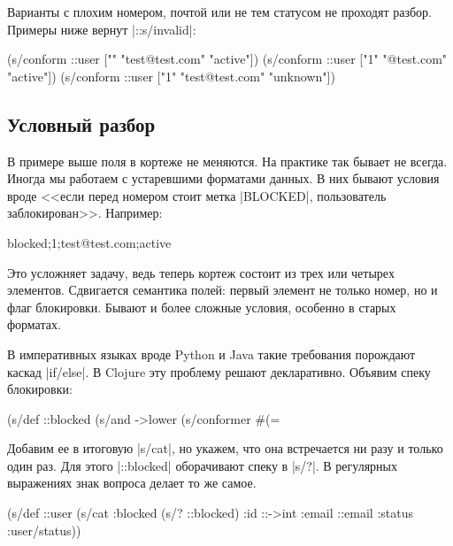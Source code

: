 Варианты с плохим номером, почтой или не тем статусом не проходят
разбор. Примеры ниже вернут \spverb|::s/invalid|:

\begin{english}
  \begin{clojure}
(s/conform ::user ["" "test@test.com" "active"])
(s/conform ::user ["1" "@test.com" "active"])
(s/conform ::user ["1" "test@test.com" "unknown"])
  \end{clojure}
\end{english}

\subsection{Условный разбор}

В примере выше поля в кортеже не меняются. На практике так бывает не
всегда. Иногда мы работаем с устаревшими форматами данных. В них бывают условия
вроде <<если перед номером стоит метка \spverb|BLOCKED|, пользователь
заблокирован>>. Например:

\begin{english}
  \begin{clojure}
blocked;1;test@test.com;active
  \end{clojure}
\end{english}

Это усложняет задачу, ведь теперь кортеж состоит из трех или четырех
элементов. Сдвигается семантика полей: первый элемент не только номер, но и флаг
блокировки. Бывают и более сложные условия, особенно в старых форматах.

В императивных языках вроде Python и Java такие требования порождают каскад
\spverb|if/else|. В Clojure эту проблему решают декларативно. Объявим спеку
блокировки:

\begin{english}
  \begin{clojure}
(s/def ::blocked
  (s/and
   ->lower
   (s/conformer
    #(= %
  \end{clojure}
\end{english}

Добавим ее в итоговую \spverb|s/cat|, но укажем, что она встречается ни разу и
только один раз. Для этого \spverb|::blocked| оборачивают спеку в \spverb|s/?|.
В регулярных выражениях знак вопроса делает то же самое.

\begin{english}
  \begin{clojure}
(s/def ::user
  (s/cat :blocked (s/? ::blocked)
         :id ::->int
         :email ::email
         :status :user/status))
  \end{clojure}
\end{english}

